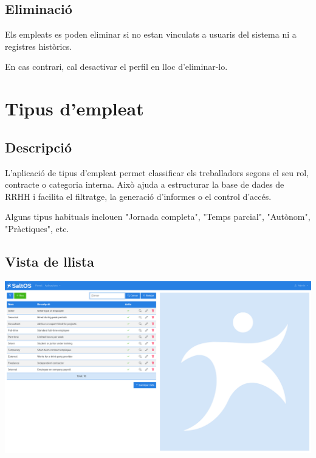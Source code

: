 \documentclass[a4paper]{article}
\begin{document}
\hypertarget{toc110}{}
\subsection{Eliminació}

Els empleats es poden eliminar si no estan vinculats a usuaris del sistema ni a registres històrics.

En cas contrari, cal desactivar el perfil en lloc d'eliminar-lo.


\hypertarget{toc111}{}
\section{Tipus d'empleat}

\hypertarget{toc112}{}
\subsection{Descripció}

L'aplicació de tipus d'empleat permet classificar els treballadors segons el seu rol, contracte o categoria interna.
Això ajuda a estructurar la base de dades de RRHH i facilita el filtratge, la generació d'informes o el control d'accés.

Alguns tipus habituals inclouen "Jornada completa", "Temps parcial", "Autònom", "Pràctiques", etc.

\hypertarget{toc113}{}
\subsection{Vista de llista}

\begin{center}\includegraphics[width=1\textwidth]{../ujest/snaps/test-screenshots-js-screenshots-hr-employees-types-list-ca-es-1-snap.png}\end{center}
\end{document}
